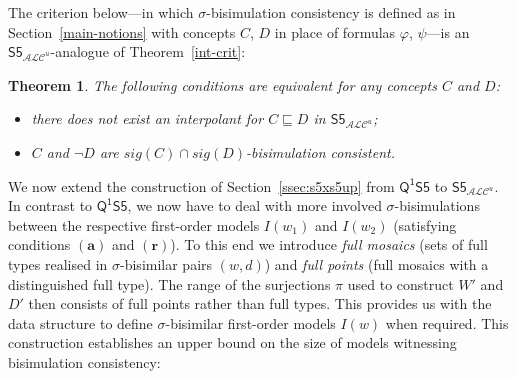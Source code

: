 \documentclass[10pt,a4paper]{amsart}
\theoremstyle{plain}
\newtheorem{thm}{Theorem}[section]
\theoremstyle{definition}
\newcommand{\sig}{\mathit{sig}}
\newcommand{\FOMS}{\ensuremath{\mathsf{Q^1S5}}}
\newcommand{\ALCIOS}{\ensuremath{\mathsf{S5}_{\mathcal{ALC}^u}}}
\begin{document}
The criterion below---in which $\sigma$-bisimulation consistency is defined as in Section~\ref{main-notions} with concepts $C$, $D$ in place of formulas $\varphi$, $\psi$---is an $\ALCIOS$-analogue of Theorem~\ref{int-crit}:

\begin{thm}\label{int-critdl}
	The following conditions are equivalent for any concepts $C$ and $D$\textup{:}
	\begin{itemize}
		\item[--] there does not exist an interpolant for $C \sqsubseteq D$ in $\ALCIOS$\textup{;}
		
		\item[--] $C$ and $\neg D$ are $\sig(C) \cap \sig(D)$-bisimulation consistent.
	\end{itemize}
\end{thm}

We now extend the construction of Section~\ref{ssec:s5xs5up} from $\FOMS$ to $\ALCIOS$. In contrast to $\FOMS$, we now have to deal with more involved $\sigma$-bisimulations between the respective first-order models $I(w_{1})$ and $I(w_{2})$ (satisfying conditions $(\mathbf{a})$ and $(\mathbf{r})$). To this end we introduce \emph{full mosaics} (sets of full types realised in $\sigma$-bisimilar pairs $(w,d)$) and \emph{full points} (full mosaics with a distinguished full type). The range of the surjections $\pi$ used to construct $W'$ and $D'$ then consists of full points rather than full types. This provides us with the data structure to define $\sigma$-bisimilar first-order models $I(w)$ when required. This construction establishes an upper bound on the size of models witnessing bisimulation consistency:
\end{document}
